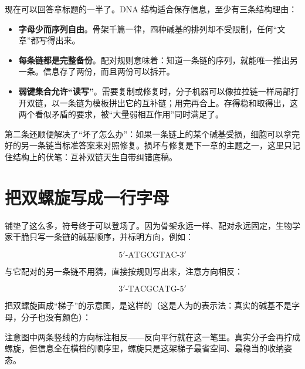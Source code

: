 现在可以回答章标题的一半了。DNA 结构适合保存信息，至少有三条结构理由：

\begin{itemize}[itemsep=2pt]
\item \textbf{字母少而序列自由}。骨架千篇一律，四种碱基的排列却不受限制，任何“文章”都写得出来。
\item \textbf{每条链都是完整备份}。配对规则意味着：知道一条链的序列，就能唯一推出另一条。信息存了两份，而且两份可以拆开。
\item \textbf{弱键集合允许“读写”}。需要复制或修复时，分子机器可以像拉拉链一样局部打开双链，以一条链为模板拼出它的互补链；用完再合上。存得稳和取得出，这两个看似矛盾的要求，被“大量弱相互作用”同时满足了。
\end{itemize}

第二条还顺便解决了“坏了怎么办”：如果一条链上的某个碱基受损，细胞可以拿完好的另一条链当标准答案来对照修复。损坏与修复是下一章的主题之一，这里只记住结构上的伏笔：互补双链天生自带纠错底稿。

\section{把双螺旋写成一行字母}

铺垫了这么多，符号终于可以登场了。因为骨架永远一样、配对永远固定，生物学家干脆只写一条链的碱基顺序，并标明方向，例如：

\[5'\text{-ATGCGTAC-}3'\]

与它配对的另一条链不用猜，直接按规则写出来，注意方向相反：

\[3'\text{-TACGCATG-}5'\]

把双螺旋画成“梯子”的示意图，是这样的（这是人为的表示法：真实的碱基不是字母，分子也没有颜色）：

\begin{center}
\end{center}

注意图中两条竖线的方向标注相反——反向平行就在这一笔里。真实分子会再拧成螺旋，但信息全在横档的顺序里，螺旋只是这架梯子最省空间、最稳当的收纳姿态。


